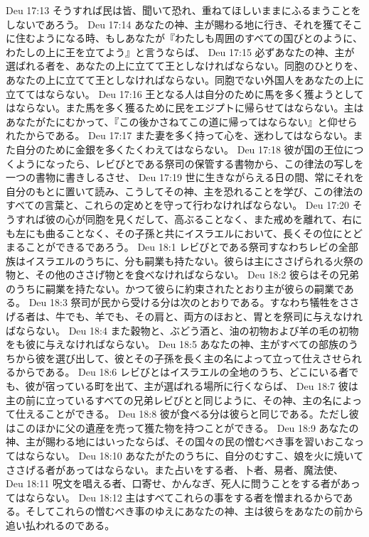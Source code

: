 Deu 17:13  そうすれば民は皆、聞いて恐れ、重ねてほしいままにふるまうことをしないであろう。
Deu 17:14  あなたの神、主が賜わる地に行き、それを獲てそこに住むようになる時、もしあなたが『わたしも周囲のすべての国びとのように、わたしの上に王を立てよう』と言うならば、
Deu 17:15  必ずあなたの神、主が選ばれる者を、あなたの上に立てて王としなければならない。同胞のひとりを、あなたの上に立てて王としなければならない。同胞でない外国人をあなたの上に立ててはならない。
Deu 17:16  王となる人は自分のために馬を多く獲ようとしてはならない。また馬を多く獲るために民をエジプトに帰らせてはならない。主はあなたがたにむかって、『この後かさねてこの道に帰ってはならない』と仰せられたからである。
Deu 17:17  また妻を多く持って心を、迷わしてはならない。また自分のために金銀を多くたくわえてはならない。
Deu 17:18  彼が国の王位につくようになったら、レビびとである祭司の保管する書物から、この律法の写しを一つの書物に書きしるさせ、
Deu 17:19  世に生きながらえる日の間、常にそれを自分のもとに置いて読み、こうしてその神、主を恐れることを学び、この律法のすべての言葉と、これらの定めとを守って行わなければならない。
Deu 17:20  そうすれば彼の心が同胞を見くだして、高ぶることなく、また戒めを離れて、右にも左にも曲ることなく、その子孫と共にイスラエルにおいて、長くその位にとどまることができるであろう。
Deu 18:1  レビびとである祭司すなわちレビの全部族はイスラエルのうちに、分も嗣業も持たない。彼らは主にささげられる火祭の物と、その他のささげ物とを食べなければならない。
Deu 18:2  彼らはその兄弟のうちに嗣業を持たない。かつて彼らに約束されたとおり主が彼らの嗣業である。
Deu 18:3  祭司が民から受ける分は次のとおりである。すなわち犠牲をささげる者は、牛でも、羊でも、その肩と、両方のほおと、胃とを祭司に与えなければならない。
Deu 18:4  また穀物と、ぶどう酒と、油の初物および羊の毛の初物をも彼に与えなければならない。
Deu 18:5  あなたの神、主がすべての部族のうちから彼を選び出して、彼とその子孫を長く主の名によって立って仕えさせられるからである。
Deu 18:6  レビびとはイスラエルの全地のうち、どこにいる者でも、彼が宿っている町を出て、主が選ばれる場所に行くならば、
Deu 18:7  彼は主の前に立っているすべての兄弟レビびとと同じように、その神、主の名によって仕えることができる。
Deu 18:8  彼が食べる分は彼らと同じである。ただし彼はこのほかに父の遺産を売って獲た物を持つことができる。
Deu 18:9  あなたの神、主が賜わる地にはいったならば、その国々の民の憎むべき事を習いおこなってはならない。
Deu 18:10  あなたがたのうちに、自分のむすこ、娘を火に焼いてささげる者があってはならない。また占いをする者、卜者、易者、魔法使、
Deu 18:11  呪文を唱える者、口寄せ、かんなぎ、死人に問うことをする者があってはならない。
Deu 18:12  主はすべてこれらの事をする者を憎まれるからである。そしてこれらの憎むべき事のゆえにあなたの神、主は彼らをあなたの前から追い払われるのである。
